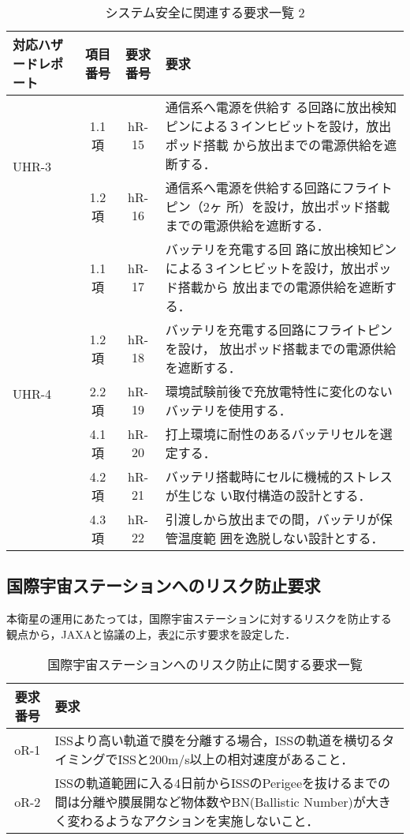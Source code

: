 \begin{table}[htb]
    \centering
    \caption{システム安全に関連する要求一覧 2}
    \begin{tabular}{|p{2cm}|c|c|p{8cm}|} \hline
        対応ハザードレポート& 項目番号 & 要求番号 & 要求 \\ \hline
        \multirow{2}{*}{UHR-3} & 1.1項 & hR-15 & 通信系へ電源を供給す
        る回路に放出検知ピンによる３インヒビットを設け，放出ポッド搭載
        から放出までの電源供給を遮断する．\\ \cline{2-4}
        & 1.2項 & hR-16 &通信系へ電源を供給する回路にフライトピン（2ヶ
          所）を設け，放出ポッド搭載までの電源供給を遮断する．
        \\ \hline
        \multirow{6}{*}{UHR-4} & 1.1項 & hR-17 & バッテリを充電する回
        路に放出検知ピンによる３インヒビットを設け，放出ポッド搭載から
        放出までの電源供給を遮断する．\\ \cline{2-4}
        & 1.2項 & hR-18 & バッテリを充電する回路にフライトピンを設け，
        放出ポッド搭載までの電源供給を遮断する．\\ \cline{2-4}
        & 2.2項 & hR-19 & 環境試験前後で充放電特性に変化のないバッテリを使用する．
        \\ \cline{2-4}
        & 4.1項 & hR-20 & 打上環境に耐性のあるバッテリセルを選定する．
        \\ \cline{2-4}
        & 4.2項 & hR-21 & バッテリ搭載時にセルに機械的ストレスが生じな
        い取付構造の設計とする．\\ \cline{2-4}
        & 4.3項 & hR-22 & 引渡しから放出までの間，バッテリが保管温度範
        囲を逸脱しない設計とする．\\ \hline
    \end{tabular}
    \label{requirment_safety2}
\end{table}

\subsection{国際宇宙ステーションへのリスク防止要求}
本衛星の運用にあたっては，国際宇宙ステーションに対するリスクを防止する
観点から，JAXAと協議の上，表\ref{requirment_op}に示す要求を設定した．

\begin{table}[htb]
    \centering
    \caption{国際宇宙ステーションへのリスク防止に関する要求一覧}
    \begin{tabular}{|c|p{12cm}|} \hline
        要求番号 & 要求 \\ \hline
        oR-1 & ISSより高い軌道で膜を分離する場合，ISSの軌道を横切るタイミングでISSと200m/s以上の相対速度があること．\\ \hline
        oR-2 & ISSの軌道範囲に入る4日前からISSのPerigeeを抜けるまでの間は分離や膜展開など物体数やBN(Ballistic Number)が大きく変わるようなアクションを実施しないこと．\\ \hline
    \end{tabular}
    \label{requirment_op}
\end{table}
